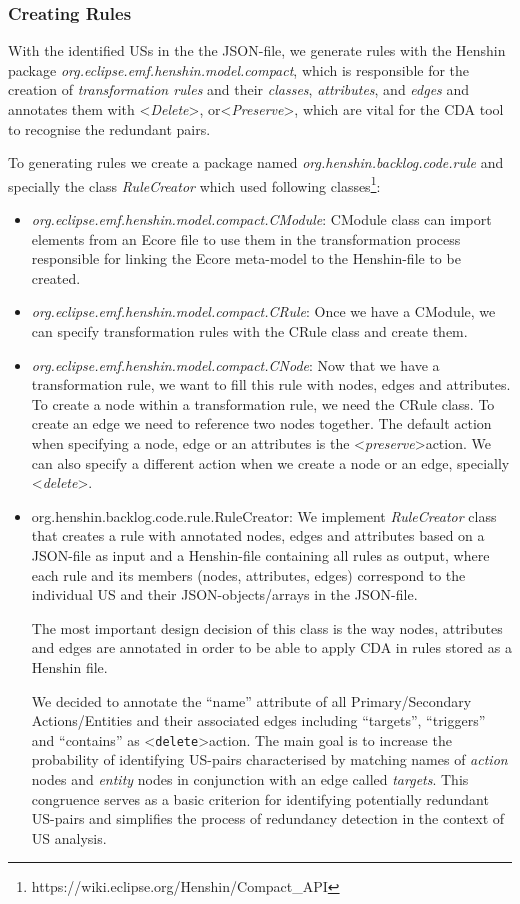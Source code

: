 \subsubsection*{Creating Rules}\label{design_workflow_rule_creator}
With the identified USs in the the JSON-file, we generate rules with the Henshin package \textit{org.eclipse.emf.henshin.model.compact}, which is responsible for the creation of \textit{transformation rules} and their \textit{classes}, \textit{attributes}, and \textit{edges} and annotates them with \textless\emph{Delete}\textgreater, or\textless\textit{Preserve}\textgreater, which are vital for the CDA tool to recognise the redundant pairs.

To generating rules we create a package named \textit{org.henshin.backlog.code.rule} and specially the class \textit{RuleCreator} which used following classes\footnote{https://wiki.eclipse.org/Henshin/Compact\_API}:
\begin{itemize}
	\item \textit{org.eclipse.emf.henshin.model.compact.CModule}: CModule class can import elements from an Ecore file to use them in the transformation process responsible for linking the Ecore meta-model to the Henshin-file to be created.
	\item \textit{org.eclipse.emf.henshin.model.compact.CRule}: Once we have a CModule, we can specify transformation rules with the CRule class and create them.
	\item \textit{org.eclipse.emf.henshin.model.compact.CNode}: Now that we have a transformation rule, we want to fill this rule with nodes, edges and attributes. To create a node within a transformation rule, we need the CRule class. To create an edge we need to reference two nodes together. The default action when specifying a node, edge or an attributes is the \textless\emph{preserve}\textgreater action. We can also specify a different action when we create a node or an edge, specially \textless\emph{delete}\textgreater.
	\item org.henshin.backlog.code.rule.RuleCreator: We implement \textit{RuleCreator} class that creates a rule with annotated nodes, edges and attributes based on a JSON-file as input and a Henshin-file containing all rules as output, where each rule and its members (nodes, attributes, edges) correspond to the individual US and their JSON-objects/arrays in the JSON-file. 
	
	The most important design decision of this class is the way nodes, attributes and edges are annotated in order to be able to apply CDA in rules stored as a Henshin file.
	
	We decided to annotate the \enquote{name} attribute of all Primary/Secondary Actions/Entities and their associated edges including \enquote{targets}, \enquote{triggers} and \enquote{contains} as \textless \texttt{delete}\textgreater  action.	The main goal is to increase the probability of identifying US-pairs characterised by matching names of \textit{action} nodes and \textit{entity} nodes in conjunction with an edge called \textit{targets}. This congruence serves as a basic criterion for identifying potentially redundant US-pairs and simplifies the process of redundancy detection in the context of US analysis.
\end{itemize}

